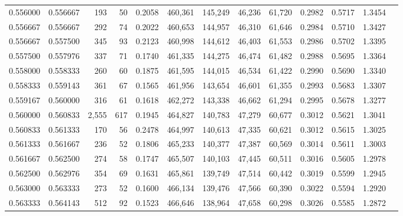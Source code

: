 \begin{tabular}{rrrrrrrrrrrrr}
0.556000 & 0.556667 &   193 &  50 &                                     0.2058 & 460,361 & 145,249 &  46,236 &  61,720 & 0.2982 & 0.5717 & 1.3454 \\
0.556667 & 0.556667 &   292 &  74 &                                     0.2022 & 460,653 & 144,957 &  46,310 &  61,646 & 0.2984 & 0.5710 & 1.3427 \\
0.556667 & 0.557500 &   345 &  93 &                                     0.2123 & 460,998 & 144,612 &  46,403 &  61,553 & 0.2986 & 0.5702 & 1.3395 \\
0.557500 & 0.557976 &   337 &  71 &                                     0.1740 & 461,335 & 144,275 &  46,474 &  61,482 & 0.2988 & 0.5695 & 1.3364 \\
0.558000 & 0.558333 &   260 &  60 &                                     0.1875 & 461,595 & 144,015 &  46,534 &  61,422 & 0.2990 & 0.5690 & 1.3340 \\
0.558333 & 0.559143 &   361 &  67 &                                     0.1565 & 461,956 & 143,654 &  46,601 &  61,355 & 0.2993 & 0.5683 & 1.3307 \\
0.559167 & 0.560000 &   316 &  61 &                                     0.1618 & 462,272 & 143,338 &  46,662 &  61,294 & 0.2995 & 0.5678 & 1.3277 \\
0.560000 & 0.560833 & 2,555 & 617 &                                     0.1945 & 464,827 & 140,783 &  47,279 &  60,677 & 0.3012 & 0.5621 & 1.3041 \\
0.560833 & 0.561333 &   170 &  56 &                                     0.2478 & 464,997 & 140,613 &  47,335 &  60,621 & 0.3012 & 0.5615 & 1.3025 \\
0.561333 & 0.561667 &   236 &  52 &                                     0.1806 & 465,233 & 140,377 &  47,387 &  60,569 & 0.3014 & 0.5611 & 1.3003 \\
0.561667 & 0.562500 &   274 &  58 &                                     0.1747 & 465,507 & 140,103 &  47,445 &  60,511 & 0.3016 & 0.5605 & 1.2978 \\
0.562500 & 0.562976 &   354 &  69 &                                     0.1631 & 465,861 & 139,749 &  47,514 &  60,442 & 0.3019 & 0.5599 & 1.2945 \\
0.563000 & 0.563333 &   273 &  52 &                                     0.1600 & 466,134 & 139,476 &  47,566 &  60,390 & 0.3022 & 0.5594 & 1.2920 \\
0.563333 & 0.564143 &   512 &  92 &                                     0.1523 & 466,646 & 138,964 &  47,658 &  60,298 & 0.3026 & 0.5585 & 1.2872 \\

\end{tabular}
